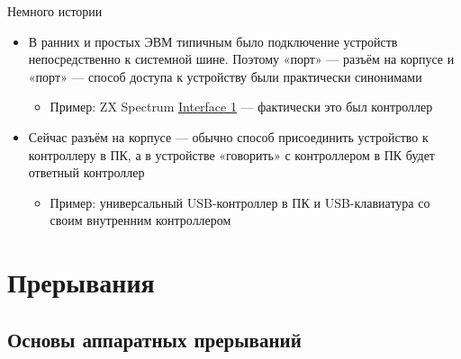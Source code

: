 \documentclass[xetex,aspectratio=43]{beamer}
\begin{document}
\begin{frame}{Немного истории}
		\begin{itemize}
			\tightlist
			\item
			В ранних и простых ЭВМ типичным было подключение устройств
			непосредственно к системной шине. Поэтому «порт» --- разъём на корпусе
			и «порт» --- способ доступа к устройству были практически синонимами
			
			\begin{itemize}
				\tightlist
				\item
				Пример: ZX Spectrum
				\href{https://en.wikipedia.org/wiki/ZX_Interface_1}{Interface 1} ---
				фактически это был контроллер
			\end{itemize}
			\item
			Сейчас разъём на корпусе --- обычно способ присоединить устройство к
			контроллеру в ПК, а в устройстве «говорить» с контроллером в ПК будет
			ответный контроллер
			
			\begin{itemize}
				\tightlist
				\item
				Пример: универсальный USB-контроллер в ПК и USB-клавиатура со своим
				внутренним контроллером
			\end{itemize}
		\end{itemize}
\end{frame}


\section{Прерывания}

\subsection{Основы аппаратных прерываний}
\end{document}

